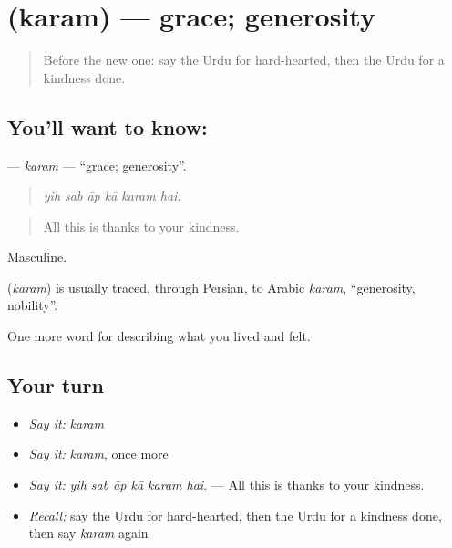 \section[\texorpdfstring{\ur{کرم} (karam)}{کرم (karam)}]{ (karam) — grace; generosity}

\label{lesson:UR-C456-karam}



\begin{quote}
Before the new one: say the Urdu for hard-hearted, then the Urdu for a kindness done.
\end{quote}

\subsection*{You'll want to know: }
\textbf{} — \emph{karam} — \textquotedblleft{}grace; generosity\textquotedblright{}.

\begin{quote}
     
\end{quote}

\begin{quote}
\emph{yih sab āp kā karam hai.}
\end{quote}

\begin{quote}
All this is thanks to your kindness.
\end{quote}

Masculine.

\begin{cousinweb}
\textbf{} (\emph{karam}) is usually traced, through Persian, to Arabic \emph{karam}, \textquotedblleft{}generosity, nobility\textquotedblright{}.
\end{cousinweb}

\begin{grammarlens}[title={What you've built}]
One more word for describing what you lived and felt.
\end{grammarlens}

\subsection*{Your turn}
\begin{itemize}
\raggedright
  \item \emph{Say it:} \emph{karam}
  \item \emph{Say it:} \emph{karam}, once more
  \item \emph{Say it:} \emph{yih sab āp kā karam hai.} — All this is thanks to your kindness.
  \item \emph{Recall:} say the Urdu for hard-hearted, then the Urdu for a kindness done, then say \emph{karam} again
\end{itemize}

